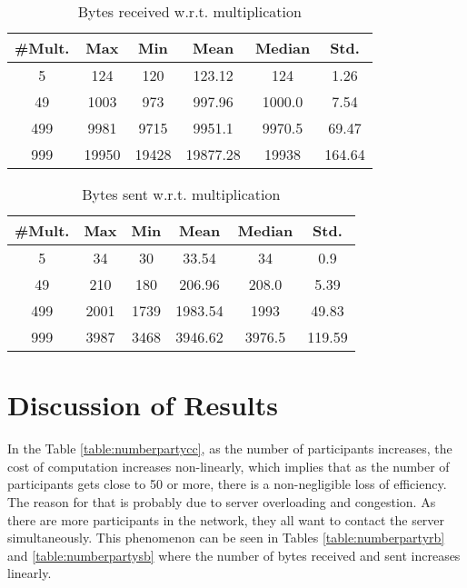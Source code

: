 \documentclass[9pt,conference]{IEEEtran}
\begin{document}
\begin{table}[H]
\caption{Bytes received w.r.t. multiplication} %
\centering %
\begin{tabular}{c c c c c c} %
\hline\hline %
\#Mult. & Max & Min & Mean & Median & Std.\\ [0.5ex] %
\hline %
5 & 124  & 120  & 123.12 & 124 & 1.26 \\ %
49 &1003 &973 &997.96 &1000.0 &7.54    \\
499 & 9981 & 9715 & 9951.1 & 9970.5 & 69.47 \\
999 & 19950 & 19428 & 19877.28 & 19938 & 164.64 \\ [1ex] %
\hline %
\end{tabular}
\label{table:numbermultrb} %
\end{table}

\begin{table}[H]
\caption{Bytes sent w.r.t. multiplication} %
\centering %
\begin{tabular}{c c c c c c} %
\hline\hline %
\#Mult. & Max & Min & Mean & Median & Std.\\ [0.5ex] %
\hline %
5 & 34  & 30 & 33.54 & 34 & 0.9 \\ %
49 &210 &180 &206.96 &208.0 &5.39    \\
499 & 2001 & 1739 & 1983.54 & 1993 & 49.83 \\
999 & 3987 & 3468 & 3946.62 & 3976.5 & 119.59 \\ [1ex] %
\hline %
\end{tabular}
\label{table:numbermultsb} %
\end{table}


\section{Discussion of Results}
In the Table \ref{table:numberpartycc}, as the number of participants increases, the cost of computation increases non-linearly, which implies that as the number of participants gets close to 50 or more, there is a non-negligible loss of efficiency. The reason for that is probably due to server overloading and congestion. As there are more participants in the network, they all want to contact the server simultaneously. This phenomenon can be seen in Tables \ref{table:numberpartyrb} and \ref{table:numberpartysb} where the number of bytes received and sent increases linearly.
\end{document}
